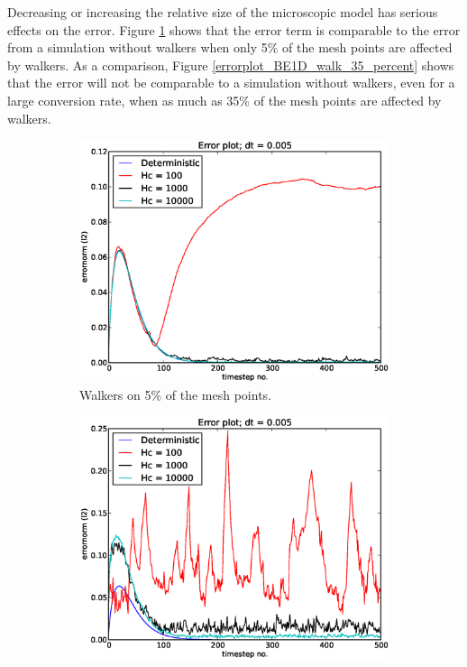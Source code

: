 Decreasing or increasing the relative size of the microscopic model has serious effects on the error. Figure \ref{errorplot_BE1D_walk_5_percent} shows that the error term is comparable to the error from a simulation without walkers when only 5\% of the mesh points are affected by walkers. 
As a comparison, Figure \ref{errorplot_BE1D_walk_35_percent} shows that the error will not be comparable to a simulation without walkers, even for a large conversion rate, when as much as 35\% of the mesh points are affected by walkers.


\begin{figure}[H]
\centering
\begin{subfigure}[b]{0.48\textwidth}
 \includegraphics[width=\textwidth]{../results/experiment_16042014_1139_convergence_tests_etc/results/errorplot.eps}
 \caption{Walkers on 5\% of the mesh points.}
 \label{errorplot_BE1D_walk_5_percent}
\end{subfigure}
\begin{subfigure}[b]{0.48\textwidth}
 \includegraphics[width=\textwidth]{../results/experiment_16042014_1202_tests_35percent_walkers/results/errorplot.eps}

\end{subfigure}
\end{figure}
